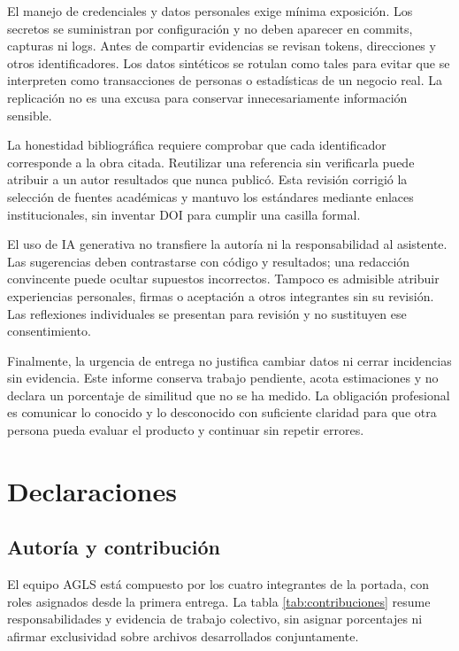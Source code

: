 \documentclass[12pt,a4paper]{article}
\newcommand{\seccion}[1]{\section{#1}}
\begin{document}
El manejo de credenciales y datos personales exige mínima exposición. Los secretos se suministran por configuración y no deben aparecer en commits, capturas ni logs. Antes de compartir evidencias se revisan tokens, direcciones y otros identificadores. Los datos sintéticos se rotulan como tales para evitar que se interpreten como transacciones de personas o estadísticas de un negocio real. La replicación no es una excusa para conservar innecesariamente información sensible.

La honestidad bibliográfica requiere comprobar que cada identificador corresponde a la obra citada. Reutilizar una referencia sin verificarla puede atribuir a un autor resultados que nunca publicó. Esta revisión corrigió la selección de fuentes académicas y mantuvo los estándares mediante enlaces institucionales, sin inventar DOI para cumplir una casilla formal.

El uso de IA generativa no transfiere la autoría ni la responsabilidad al asistente. Las sugerencias deben contrastarse con código y resultados; una redacción convincente puede ocultar supuestos incorrectos. Tampoco es admisible atribuir experiencias personales, firmas o aceptación a otros integrantes sin su revisión. Las reflexiones individuales se presentan para revisión y no sustituyen ese consentimiento.

Finalmente, la urgencia de entrega no justifica cambiar datos ni cerrar incidencias sin evidencia. Este informe conserva trabajo pendiente, acota estimaciones y no declara un porcentaje de similitud que no se ha medido. La obligación profesional es comunicar lo conocido y lo desconocido con suficiente claridad para que otra persona pueda evaluar el producto y continuar sin repetir errores.

\seccion{Declaraciones}
\subsection{Autoría y contribución}
El equipo AGLS está compuesto por los cuatro integrantes de la portada, con roles asignados desde la primera entrega. La tabla \ref{tab:contribuciones} resume responsabilidades y evidencia de trabajo colectivo, sin asignar porcentajes ni afirmar exclusividad sobre archivos desarrollados conjuntamente.
\end{document}
